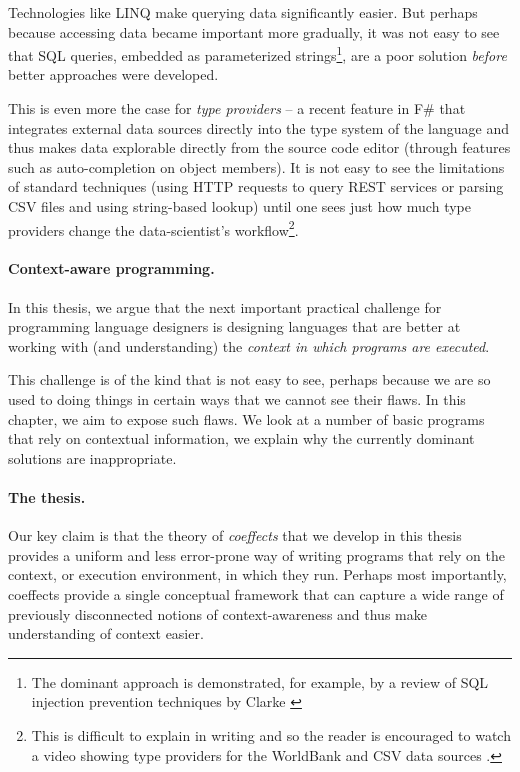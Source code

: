 Technologies like LINQ \cite{app-linq} make querying data significantly easier. But perhaps
because accessing data became important more gradually, it was not easy to see that SQL queries,
embedded as parameterized strings\footnote{The dominant approach is demonstrated, for example,
by a review of SQL injection prevention techniques by Clarke \cite{app-sql-injection}}, are a
poor solution \emph{before} better approaches were developed.

This is even more the case for \emph{type providers} -- a recent feature in F\# that integrates
external data sources directly into the type system of the language and thus makes data explorable
directly from the source code editor (through features such as auto-completion on object members).
It is not easy to see the limitations of standard techniques (using HTTP requests to query REST
services or parsing CSV files and using string-based lookup) until one sees just how much type
providers change the data-scientist's workflow\footnote{This is difficult to explain in writing
and so the reader is encouraged to watch a video showing type providers for the WorldBank and CSV
data sources \cite{app-fsharp-world}.}.

\paragraph{Context-aware programming.}

In this thesis, we argue that the next important practical challenge for programming language
designers is designing languages that are better at working with (and understanding) the
\emph{context in which programs are executed}.

This challenge is of the kind that is not easy to see, perhaps because we are so used to
doing things in certain ways that we cannot see their flaws. In this chapter, we aim to
expose such flaws. We look at a number of basic programs that rely on contextual
information, we explain why the currently dominant solutions are inappropriate.

\paragraph{The thesis.}
Our key claim is that the theory of \emph{coeffects} that we develop in this thesis provides
a uniform and less error-prone way of writing programs that rely on the context, or
execution environment, in which they run. Perhaps most importantly, coeffects provide a single 
conceptual framework that can capture a wide range of previously disconnected notions of 
context-awareness and thus make understanding of context easier. 


